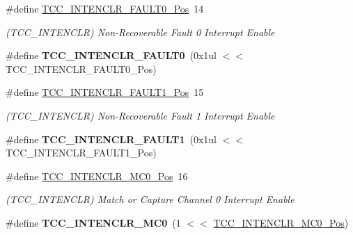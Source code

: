 \begin{DoxyCompactItemize}
\item 
\hypertarget{group___s_a_m_l21___t_c_c_gabefb7fead743663aa0c8a242b5f7ced0}{}\#define \hyperlink{group___s_a_m_l21___t_c_c_gabefb7fead743663aa0c8a242b5f7ced0}{T\+C\+C\+\_\+\+I\+N\+T\+E\+N\+C\+L\+R\+\_\+\+F\+A\+U\+L\+T0\+\_\+\+Pos}~14\label{group___s_a_m_l21___t_c_c_gabefb7fead743663aa0c8a242b5f7ced0}

\begin{DoxyCompactList}\small\item\em (T\+C\+C\+\_\+\+I\+N\+T\+E\+N\+C\+L\+R) Non-\/\+Recoverable Fault 0 Interrupt Enable \end{DoxyCompactList}\item 
\hypertarget{group___s_a_m_l21___t_c_c_ga8d1cb20e8f5d59c7837f7082632fc092}{}\#define {\bfseries T\+C\+C\+\_\+\+I\+N\+T\+E\+N\+C\+L\+R\+\_\+\+F\+A\+U\+L\+T0}~(0x1ul $<$$<$ T\+C\+C\+\_\+\+I\+N\+T\+E\+N\+C\+L\+R\+\_\+\+F\+A\+U\+L\+T0\+\_\+\+Pos)\label{group___s_a_m_l21___t_c_c_ga8d1cb20e8f5d59c7837f7082632fc092}

\item 
\hypertarget{group___s_a_m_l21___t_c_c_gaadf2b97fa1520e87d39b1dcf65aa47af}{}\#define \hyperlink{group___s_a_m_l21___t_c_c_gaadf2b97fa1520e87d39b1dcf65aa47af}{T\+C\+C\+\_\+\+I\+N\+T\+E\+N\+C\+L\+R\+\_\+\+F\+A\+U\+L\+T1\+\_\+\+Pos}~15\label{group___s_a_m_l21___t_c_c_gaadf2b97fa1520e87d39b1dcf65aa47af}

\begin{DoxyCompactList}\small\item\em (T\+C\+C\+\_\+\+I\+N\+T\+E\+N\+C\+L\+R) Non-\/\+Recoverable Fault 1 Interrupt Enable \end{DoxyCompactList}\item 
\hypertarget{group___s_a_m_l21___t_c_c_gacade9171a62ca75176febf7191858814}{}\#define {\bfseries T\+C\+C\+\_\+\+I\+N\+T\+E\+N\+C\+L\+R\+\_\+\+F\+A\+U\+L\+T1}~(0x1ul $<$$<$ T\+C\+C\+\_\+\+I\+N\+T\+E\+N\+C\+L\+R\+\_\+\+F\+A\+U\+L\+T1\+\_\+\+Pos)\label{group___s_a_m_l21___t_c_c_gacade9171a62ca75176febf7191858814}

\item 
\hypertarget{group___s_a_m_l21___t_c_c_gad9d20c34f33e188df3ba0647a15dde05}{}\#define \hyperlink{group___s_a_m_l21___t_c_c_gad9d20c34f33e188df3ba0647a15dde05}{T\+C\+C\+\_\+\+I\+N\+T\+E\+N\+C\+L\+R\+\_\+\+M\+C0\+\_\+\+Pos}~16\label{group___s_a_m_l21___t_c_c_gad9d20c34f33e188df3ba0647a15dde05}

\begin{DoxyCompactList}\small\item\em (T\+C\+C\+\_\+\+I\+N\+T\+E\+N\+C\+L\+R) Match or Capture Channel 0 Interrupt Enable \end{DoxyCompactList}\item 
\hypertarget{group___s_a_m_l21___t_c_c_ga24befc3be327e6e929aff6baae295d28}{}\#define {\bfseries T\+C\+C\+\_\+\+I\+N\+T\+E\+N\+C\+L\+R\+\_\+\+M\+C0}~(1 $<$$<$ \hyperlink{group___s_a_m_l21___t_c_c_gad9d20c34f33e188df3ba0647a15dde05}{T\+C\+C\+\_\+\+I\+N\+T\+E\+N\+C\+L\+R\+\_\+\+M\+C0\+\_\+\+Pos})\label{group___s_a_m_l21___t_c_c_ga24befc3be327e6e929aff6baae295d28}


\end{DoxyCompactItemize}
